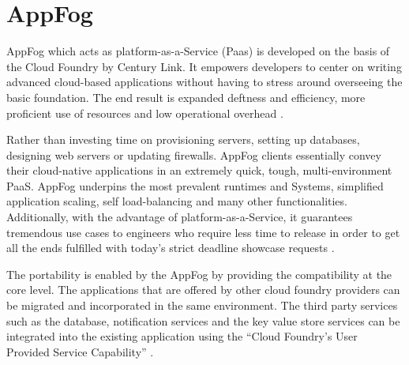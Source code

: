 \section{AppFog}
AppFog which acts as platform-as-a-Service (Paas) is developed on the
basis of the Cloud Foundry by Century Link. It empowers developers to center
on writing advanced cloud-based applications without having to stress
around overseeing the basic foundation. The end result is expanded
deftness and efficiency, more proficient use of resources and low
operational overhead \cite{hid-sp18-412-century_link_appfog}.

Rather than investing time on  provisioning servers, setting up databases,
designing web servers or updating firewalls. AppFog clients essentially
convey their cloud-native applications in an extremely quick, tough,
multi-environment PaaS. AppFog underpins the most prevalent runtimes and
Systems, simplified application scaling, self load-balancing and
many other functionalities. Additionally, with the advantage of
platform-as-a-Service, it guarantees tremendous
use cases to engineers who require less time to release
in order to get all the ends fulfilled with today’s strict
deadline showcase requests \cite{hid-sp18-412-century_link_appfog}.

The portability is enabled by the AppFog by providing the compatibility at
the core level. The applications that are offered by other cloud foundry 
providers can be migrated and incorporated in the same environment. 
The third party services such as the database, notification services 
and the key value store services can be integrated into the existing 
application using the “Cloud Foundry’s User Provided Service Capability”
\cite{hid-sp18-412-century_link_appfog}.

